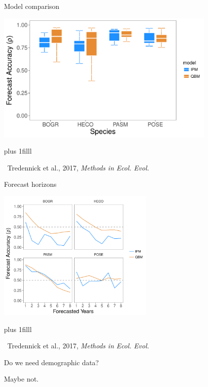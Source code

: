 \documentclass[14pt, compress, aspectratio=1610]{beamer}
\newcommand{\btVFill}{\vskip0pt plus 1filll}
\newcommand{\credit}[1]{\btVFill\par\hfill \footnotesize ~#1}
\begin{document}
\begin{frame}{%
\protect\hypertarget{model-comparison-1}{%
Model comparison}}

\centering

\includegraphics[height=2.5in]{./figures/mee_forecast_accuracy.pdf}

\credit{Tredennick et al., 2017, \emph{Methods in Ecol. Evol.}}

\end{frame}

\begin{frame}{%
\protect\hypertarget{forecast-horizons}{%
Forecast horizons}}

\centering

\includegraphics[height=2.5in]{./figures/mee_horizons.pdf}

\credit{Tredennick et al., 2017, \emph{Methods in Ecol. Evol.}}

\end{frame}

\begin{frame}{%
\protect\hypertarget{do-we-need-demographic-data-1}{%
Do we need demographic data?}}

\centering

Maybe not.

\end{frame}
\end{document}
